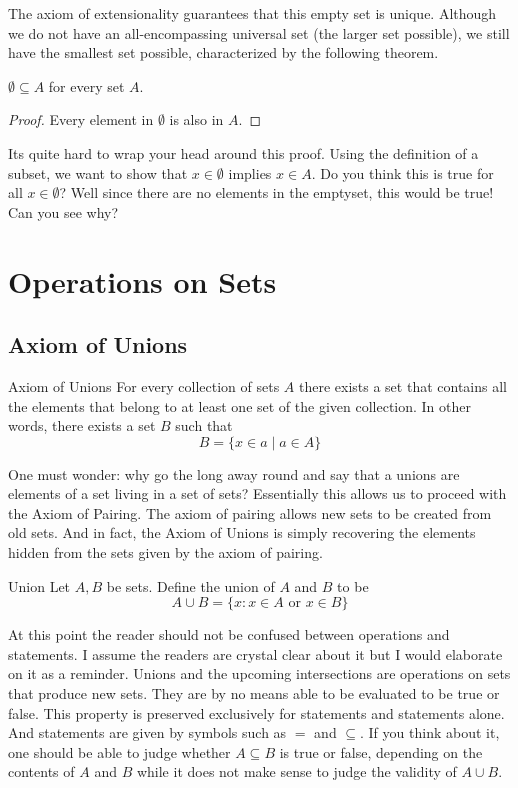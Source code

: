 \documentclass[a4paper]{article}
\begin{document}
The axiom of extensionality guarantees that this empty set is unique. Although we do not have an all-encompassing universal set (the larger set possible), we still have the smallest set possible, characterized by the following theorem. 

\begin{thm}{}{} $\emptyset\subseteq A$ for every set $A$. \tcbline
\begin{proof} Every element in $\emptyset$ is also in $A$. 
\end{proof}
\end{thm}

Its quite hard to wrap your head around this proof. Using the definition of a subset, we want to show that $x\in\emptyset$ implies $x\in A$. Do you think this is true for all $x\in\emptyset$? Well since there are no elements in the emptyset, this would be true! Can you see why?

\pagebreak

\section{Operations on Sets}
\subsection{Axiom of Unions}
\begin{axm}{Axiom of Unions}{} For every collection of sets $A$ there exists a set that contains all the elements that belong to at least one set of the given collection. In other words, there exists a set $B$ such that $$B=\{x\in a\;|\;a\in A\}$$
\end{axm}

One must wonder: why go the long away round and say that a unions are elements of a set living in a set of sets? Essentially this allows us to proceed with the Axiom of Pairing. The axiom of pairing allows new sets to be created from old sets. And in fact, the Axiom of Unions is simply recovering the elements hidden from the sets given by the axiom of pairing. 

\begin{defn}{Union}{} Let $A,B$ be sets. Define the union of $A$ and $B$ to be $$A\cup B=\{x:x\in A\text{ or }x\in B\}$$
\end{defn}

At this point the reader should not be confused between operations and statements. I assume the readers are crystal clear about it but I would elaborate on it as a reminder. Unions and the upcoming intersections are operations on sets that produce new sets. They are by no means able to be evaluated to be true or false. This property is preserved exclusively for statements and statements alone. And statements are given by symbols such as $=$ and $\subseteq$. If you think about it, one should be able to judge whether $A\subseteq B$ is true or false, depending on the contents of $A$ and $B$ while it does not make sense to judge the validity of $A\cup B$. 
\end{document}

